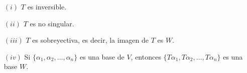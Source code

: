 \begin{itemize}
    \item[$(i)$] $T$ es inversible.
    \item[$(ii)$] $T$ es no singular.
    \item[$(iii)$] $T$ es sobreyectiva, es decir, la imagen de $T$ es $W$.
    \item[$(iv)$] Si $\{\alpha_{1}, \alpha_{2}, \dots , \alpha_{n}\}$ es
    una base de $V$, entonces $\{T\alpha_{1}, T\alpha_{2}, \dots ,
    T\alpha_{n}\}$ es una base $W$.
\end{itemize}
